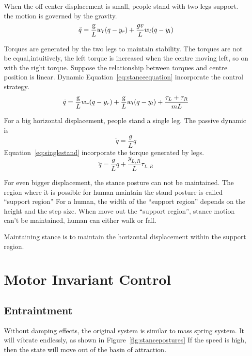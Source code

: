\begin{itemize}
When the off center  displacement  is small, people stand with two legs support.
the motion is governed by the gravity.
\[
\ddot{q}=\frac{\mathrm{g}}{L}w_r(q-y_r)+\frac{gv}{L}w_l(q-y_l)
\]

Torques are generated by the two legs to maintain stability.
The torques are not be equal,intuitively, the left torque is increased when the centre moving left, so on with the right torque.
Suppose the relationship between torques and centre position is linear.
Dynamic Equation~\ref{eq:stanceequation} incorporate the control strategy.
\begin{equation}
\label{eq:stanceequation}
\ddot{q}=\frac{\mathrm{g}}{L}w_r(q-y_r)+\frac{\mathrm{g}}{L}w_l(q-y_l)+\frac{\tau_L+\tau_R}{mL}
\end{equation}



For a big horizontal  displacement,  people stand a single leg.
The passive dynamic is
\[
\ddot{q}=\frac{g}{L}q
\]
Equation~\ref{eq:singlestand} incorporate the torque generated by legs.
\begin{equation}
\label{eq:singlestand}
\ddot{q}=\frac{g}{L}q+\frac{y_{L,R}}{L}\tau_{L,R}
\end{equation}

For even bigger displacement,  the stance posture can not be maintained.
The region where it is possible for human maintain the stand posture is called ``support region''
For a human, the width of the ``support region'' depends on the  height and the step size.
When move out the ``support region'', stance motion can't be maintained, human can either walk or fall.
\end{itemize}


Maintaining stance is to maintain the horizontal displacement within the support region.

\section {Motor Invariant Control}
\subsection{Entraintment}
Without damping effects, the original system is similar to mass spring system.
It will vibrate endlessly, as shown in Figure~\ref{fig:stancepostures}
If the speed is high, then the state will move out of the basin of attraction.


